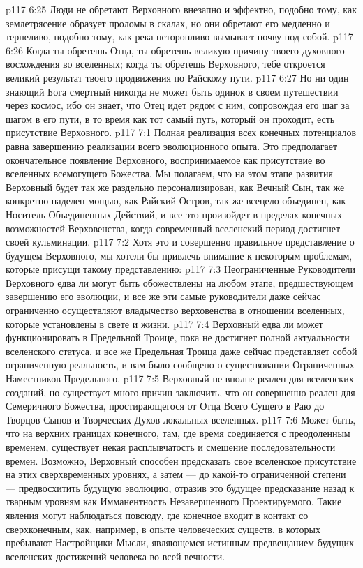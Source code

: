 \vs p117 6:25 \pc Люди не обретают Верховного внезапно и эффектно, подобно тому, как землетрясение образует проломы в скалах, но они обретают его медленно и терпеливо, подобно тому, как река неторопливо вымывает почву под собой.
\vs p117 6:26 Когда ты обретешь Отца, ты обретешь великую причину твоего духовного восхождения во вселенных; когда ты обретешь Верховного, тебе откроется великий результат твоего продвижения по Райскому пути.
\vs p117 6:27 Но ни один знающий Бога смертный никогда не может быть одинок в своем путешествии через космос, ибо он знает, что Отец идет рядом с ним, сопровождая его шаг за шагом в его пути, в то время как тот самый путь, который он проходит, есть присутствие Верховного.
\vs p117 7:1 Полная реализация всех конечных потенциалов равна завершению реализации всего эволюционного опыта. Это предполагает окончательное появление Верховного, воспринимаемое как присутствие во вселенных всемогущего Божества. Мы полагаем, что на этом этапе развития Верховный будет так же раздельно персонализирован, как Вечный Сын, так же конкретно наделен мощью, как Райский Остров, так же всецело объединен, как Носитель Объединенных Действий, и все это произойдет в пределах конечных возможностей Верховенства, когда современный вселенский период достигнет своей кульминации.
\vs p117 7:2 Хотя это и совершенно правильное представление о будущем Верховного, мы хотели бы привлечь внимание к некоторым проблемам, которые присущи такому представлению:
\vs p117 7:3 \bibnobreakspace Неограниченные Руководители Верховного едва ли могут быть обожествлены на любом этапе, предшествующем завершению его эволюции, и все же эти самые руководители даже сейчас ограниченно осуществляют владычество верховенства в отношении вселенных, которые установлены в свете и жизни.
\vs p117 7:4 \pc {}\bibnobreakspace Верховный едва ли может функционировать в Предельной Троице, пока не достигнет полной актуальности вселенского статуса, и все же Предельная Троица даже сейчас представляет собой ограниченную реальность, и вам было сообщено о существовании Ограниченных Наместников Предельного.
\vs p117 7:5 \pc {}\bibnobreakspace Верховный не вполне реален для вселенских созданий, но существует много причин заключить, что он совершенно реален для Семеричного Божества, простирающегося от Отца Всего Сущего в Раю до Творцов\hyp{}Сынов и Творческих Духов локальных вселенных.
\vs p117 7:6 \pc Может быть, что на верхних границах конечного, там, где время соединяется с преодоленным временем, существует некая расплывчатость и смешение последовательности времен. Возможно, Верховный способен предсказать свое вселенское присутствие на этих сверхвременных уровнях, а затем --- до какой\hyp{}то ограниченной степени --- предвосхитить будущую эволюцию, отразив это будущее предсказание назад к тварным уровням как Имманентность Незавершенного Проектируемого. Такие явления могут наблюдаться повсюду, где конечное входит в контакт со сверхконечным, как, например, в опыте человеческих существ, в которых пребывают Настройщики Мысли, являющемся истинным предвещанием будущих вселенских достижений человека во всей вечности.

